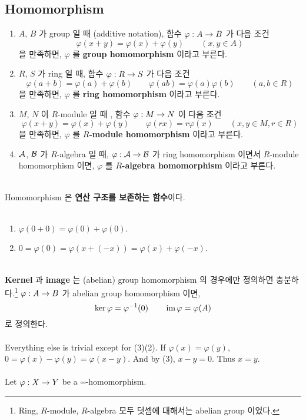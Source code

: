 \subsection{Homomorphism}
\begin{enumerate}
	\item $A$, $B$ 가 group 일 때 (additive notation), 함수 $\varphi: A\rightarrow B$ 가 다음 조건
	$$\varphi(x+y) = \varphi(x)+\varphi(y) \qquad(x, y\in A)$$
	을 만족하면, $\varphi$ 를 \textbf{group homomorphism} 이라고 부른다.
	\item $R$, $S$ 가 ring 일 때, 함수 $\varphi: R\rightarrow S$ 가 다음 조건
	$$\varphi(a+b) = \varphi(a)+\varphi(b) \qquad \varphi(ab)=\varphi(a)\varphi(b) \qquad(a, b\in R)$$
	을 만족하면, $\varphi$ 를 \textbf{ring homomorphism} 이라고 부른다.
	\item $M$, $N$ 이 $R$-module 일 때 , 함수 $\varphi: M\rightarrow N$ 이 다음 조건
	$$\varphi(x+y) = \varphi(x)+\varphi(y) \qquad \varphi(rx) = r\varphi(x) \qquad(x, y\in M, r\in R)$$
	을 만족하면, $\varphi$ 를 \textbf{$R$-module homomorphism} 이라고 부른다.
	\item $\mathcal{A}$, $\mathcal{B}$ 가 $R$-algebra 일 때, $\varphi:\mathcal{A}\rightarrow\mathcal{B}$ 가 ring homomorphism 이면서 $R$-module homomorphism 이면, $\varphi$ 를 \textbf{$R$-algebra homomorphism} 이라고 부른다.
\end{enumerate}~
\\
Homomorphism 은 \textbf{연산 구조를 보존하는 함수}이다.\\
\\
\begin{enumerate}
	\item $\varphi(0+0) =\varphi(0) +\varphi(0)$.
	\item $0 = \varphi(0) = \varphi(x + (-x)) = \varphi(x) + \varphi(-x)$.
\end{enumerate}~
\\
 \textbf{Kernel} 과 \textbf{image} 는 (abelian) group homomorphism 의 경우에만 정의하면 충분하다.\footnote{Ring, $R$-module, $R$-algebra 모두 덧셈에 대해서는 abelian group 이었다.} $\varphi:A\rightarrow B$ 가 abelian group homomorphism 이면,
$$\ker \varphi = \varphi^{-1}(0)\qquad \operatorname{im}\varphi = \varphi(A)$$
로 정의한다.\\
\\
 Everything else is trivial except for (3)\mimp(2). If $\varphi(x) = \varphi(y)$, $0 = \varphi(x)-\varphi(y) = \varphi(x-y)$. And by (3), $x-y = 0$. Thus $x=y$.\\
\\
 Let $\varphi: X\rightarrow Y$ be a $\square\square$-homomorphism.
